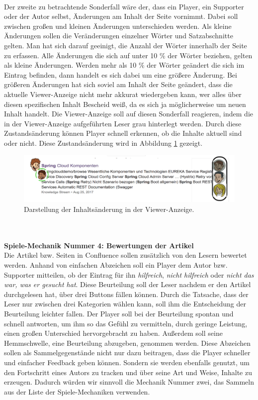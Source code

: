 \documentclass[a4paper,12pt,twoside]{scrartcl}
\begin{document}
\\
Der zweite zu betrachtende Sonderfall wäre der, dass ein Player, ein Supporter oder der Autor selbst, Änderungen am Inhalt der Seite vornimmt. Dabei soll zwischen großen und kleinen Änderungen unterschieden werden. Als kleine Änderungen sollen die Veränderungen einzelner Wörter und Satzabschnitte gelten. Man hat sich darauf geeinigt, die Anzahl der Wörter innerhalb der Seite zu erfassen. Alle Änderungen die sich auf unter 10 \% der Wörter beziehen, gelten als kleine Änderungen. Werden mehr als 10 \% der Wörter geändert die sich im Eintrag befinden, dann handelt es sich dabei um eine größere Änderung. Bei größeren Änderungen hat sich soviel am Inhalt der Seite geändert, dass die aktuelle Viewer-Anzeige nicht mehr akkurat wiedergeben kann, wer alles über diesen spezifischen Inhalt Bescheid weiß, da es sich ja möglicherweise um neuen Inhalt handelt. Die Viewer-Anzeige soll auf diesen Sonderfall reagieren, indem die in der Viewer-Anzeige aufgeführten Leser grau hinterlegt werden. Durch diese Zustandsänderung können Player schnell erkennen, ob die Inhalte aktuell sind oder nicht. Diese Zustandsänderung wird in Abbildung \ref{NeueSuchErgebnisseSupporterGrau} gezeigt.  
\\
\begin{figure}[h!]
\begin{center}
\includegraphics[scale = 0.5]{Bilder/NeueSuchErgebnisseSupporterGrau.png}
\caption{Darstellung der Inhaltsänderung in der Viewer-Anzeige.}
\label{NeueSuchErgebnisseSupporterGrau}
\end{center}
\end{figure} 
\\\\
\textbf{Spiele-Mechanik Nummer 4: Bewertungen der Artikel}\\
Die Artikel bzw. Seiten in Confluence sollen zusätzlich von den Lesern bewertet werden. Anhand von einfachen Abzeichen soll ein Player dem Autor bzw. Supporter mitteilen, ob der Eintrag für ihn \textit{hilfreich}, \textit{nicht hilfreich} oder \textit{nicht das war, was er gesucht hat}. Diese Beurteilung soll der Leser nachdem er den Artikel durchgelesen hat, über drei Buttons fällen können. Durch die Tatsache, dass der Leser nur zwischen drei Kategorien wählen kann, soll ihm die Entscheidung der Beurteilung leichter fallen. Der Player soll bei der Beurteilung spontan und schnell antworten, um ihm so das Gefühl zu vermitteln, durch geringe Leistung, einen großen Unterschied hervorgebracht zu haben. Außerdem soll seine Hemmschwelle, eine Beurteilung abzugeben, genommen werden. Diese Abzeichen sollen als Sammelgegenstände nicht nur dazu beitragen, dass die Player schneller und einfacher Feedback geben können. Sondern sie werden ebenfalls genutzt, um den Fortschritt eines Autors zu tracken und über seine Art und Weise, Inhalte zu erzeugen. Dadurch würden wir sinnvoll die Mechanik Nummer zwei, das Sammeln aus der Liste der Spiele-Mechaniken verwenden.   
\end{document}
